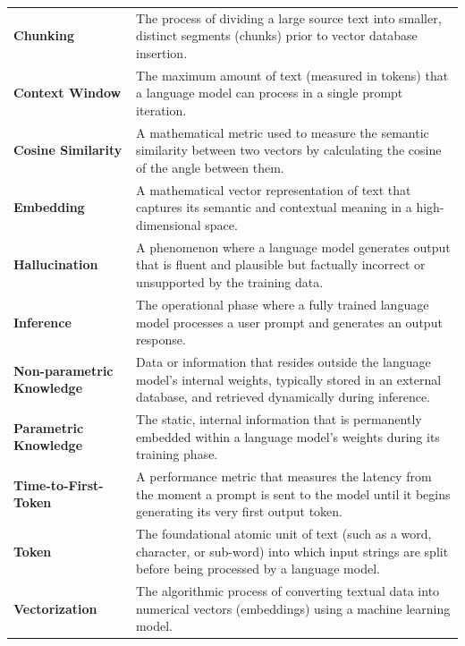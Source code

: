 \begin{tabular}{lp{9.5cm}}
\textbf{Chunking}           & The process of dividing a large source text into smaller, distinct segments (chunks) prior to vector database insertion. \\
\textbf{Context Window}     & The maximum amount of text (measured in tokens) that a language model can process in a single prompt iteration. \\
\textbf{Cosine Similarity}   & A mathematical metric used to measure the semantic similarity between two vectors by calculating the cosine of the angle between them. \\
\textbf{Embedding}          & A mathematical vector representation of text that captures its semantic and contextual meaning in a high-dimensional space. \\
\textbf{Hallucination}      & A phenomenon where a language model generates output that is fluent and plausible but factually incorrect or unsupported by the training data. \\
\textbf{Inference}          & The operational phase where a fully trained language model processes a user prompt and generates an output response. \\
\textbf{Non-parametric Knowledge} & Data or information that resides outside the language model's internal weights, typically stored in an external database, and retrieved dynamically during inference. \\
\textbf{Parametric Knowledge} & The static, internal information that is permanently embedded within a language model's weights during its training phase. \\
\textbf{Time-to-First-Token} & A performance metric that measures the latency from the moment a prompt is sent to the model until it begins generating its very first output token. \\
\textbf{Token}              & The foundational atomic unit of text (such as a word, character, or sub-word) into which input strings are split before being processed by a language model. \\
\textbf{Vectorization}      & The algorithmic process of converting textual data into numerical vectors (embeddings) using a machine learning model. \\
\end{tabular}